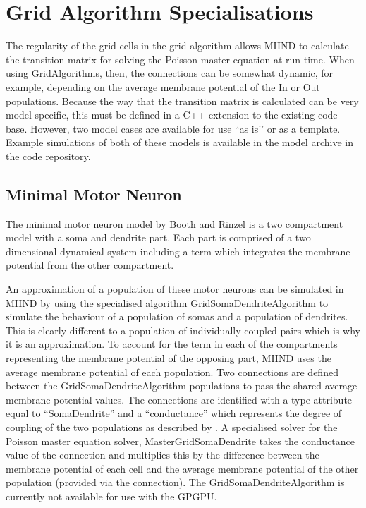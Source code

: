 \documentclass[utf8]{frontiers_suppmat} %
\begin{document}
\section{Grid Algorithm Specialisations}
\label{gridalgospec}
The regularity of the grid cells in the grid algorithm allows MIIND to calculate the transition matrix for solving the Poisson master equation at run time. When using GridAlgorithms, then, the connections can be somewhat dynamic, for example, depending on the average membrane potential of the In or Out populations. Because the way that the transition matrix is calculated can be very model specific, this must be defined in a C++ extension to the existing code base. However, two model cases are available for use ``as is’’ or as a template. Example simulations of both of these models is available in the model archive in the code repository.

\subsection{Minimal Motor Neuron}
The minimal motor neuron model by Booth and Rinzel \cite{booth1995minimal} is a two compartment model with a soma and dendrite part. Each part is comprised of a two dimensional dynamical system including a term which integrates the membrane potential from the other compartment. 

An approximation of a population of these motor neurons can be simulated in MIIND by using the specialised algorithm GridSomaDendriteAlgorithm to simulate the behaviour of a population of somas and a population of dendrites. This is clearly different to a population of individually coupled pairs which is why it is an approximation. To account for the term in each of the compartments representing the membrane potential of the opposing part, MIIND uses the average membrane potential of each population. Two connections are defined between the GridSomaDendriteAlgorithm populations to pass the shared average membrane potential values. The connections are identified with a type attribute equal to ``SomaDendrite'' and a ``conductance'' which represents the degree of coupling of the two populations as described by \cite{booth1995minimal}. A specialised solver for the Poisson master equation solver, MasterGridSomaDendrite takes the conductance value of the connection and multiplies this by the difference between the membrane potential of each cell and the average membrane potential of the other population (provided via the connection). The GridSomaDendriteAlgorithm is currently not available for use with the GPGPU.
\end{document}
